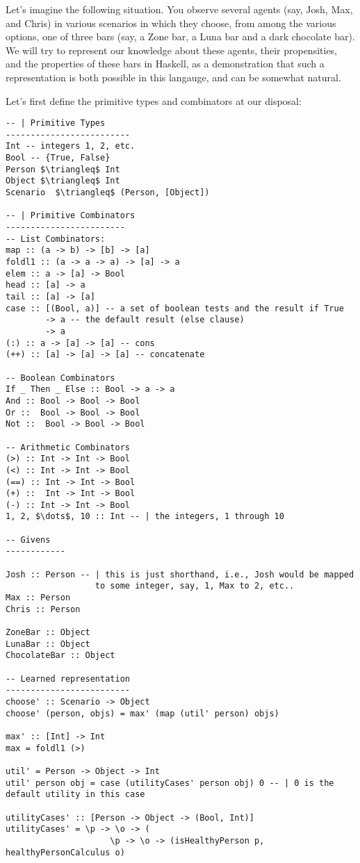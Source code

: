 \documentclass{article}
\begin{document}
Let's imagine the following situation. You observe several agents
(say, Josh, Max, and Chris) in various scenarios in which they choose,
from among the various options, one of three bars (say, a Zone bar, a
Luna bar and a dark chocolate bar). We will try to represent our
knowledge about these agents, their propensities, and the properties
of these bars in Haskell, as a demonstration that such a
representation is both possible in this langauge, and can be somewhat
natural.

Let's first define the primitive types and combinators at our disposal:


\begin{lstlisting}[mathescape]
-- | Primitive Types
-------------------------
Int -- integers 1, 2, etc.
Bool -- {True, False}
Person $\triangleq$ Int
Object $\triangleq$ Int
Scenario  $\triangleq$ (Person, [Object])

-- | Primitive Combinators
------------------------
-- List Combinators:
map :: (a -> b) -> [b] -> [a]
foldl1 :: (a -> a -> a) -> [a] -> a
elem :: a -> [a] -> Bool
head :: [a] -> a
tail :: [a] -> [a]
case :: [(Bool, a)] -- a set of boolean tests and the result if True
        -> a -- the default result (else clause) 
        -> a
(:) :: a -> [a] -> [a] -- cons
(++) :: [a] -> [a] -> [a] -- concatenate

-- Boolean Combinators
If _ Then _ Else :: Bool -> a -> a
And :: Bool -> Bool -> Bool
Or ::  Bool -> Bool -> Bool
Not ::  Bool -> Bool -> Bool

-- Arithmetic Combinators
(>) :: Int -> Int -> Bool
(<) :: Int -> Int -> Bool
(==) :: Int -> Int -> Bool
(+) ::  Int -> Int -> Bool
(-) :: Int -> Int -> Bool
1, 2, $\dots$, 10 :: Int -- | the integers, 1 through 10

-- Givens
------------

Josh :: Person -- | this is just shorthand, i.e., Josh would be mapped
                  to some integer, say, 1, Max to 2, etc..
Max :: Person
Chris :: Person

ZoneBar :: Object
LunaBar :: Object
ChocolateBar :: Object

-- Learned representation
-------------------------
choose' :: Scenario -> Object
choose' (person, objs) = max' (map (util' person) objs)

max' :: [Int] -> Int
max = foldl1 (>)

util' = Person -> Object -> Int
util' person obj = case (utilityCases' person obj) 0 -- | 0 is the default utility in this case

utilityCases' :: [Person -> Object -> (Bool, Int)]
utilityCases' = \p -> \o -> (
                     \p -> \o -> (isHealthyPerson p, healthyPersonCalculus o)



\end{lstlisting}
\end{document}
